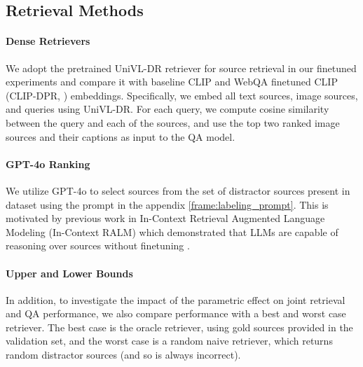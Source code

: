 
\subsection{Retrieval Methods}
\label{sec:retrieval_models}
\paragraph{Dense Retrievers} We adopt the pretrained UniVL-DR retriever for source retrieval in our finetuned experiments \citep{liu_universal_2023} and compare it with baseline CLIP \citep{radford2021learning} and WebQA finetuned CLIP (CLIP-DPR, \cite{liu_universal_2023}) embeddings. Specifically, we embed all text sources, image sources, and queries using UniVL-DR. For each query, we compute cosine similarity between the query and each of the sources, and use the top two ranked image sources and their captions as input to the QA model.

\paragraph{GPT-4o Ranking} 
We utilize GPT-4o to select sources from the set of distractor sources present in dataset using the prompt in the appendix \autoref{frame:labeling_prompt}. This is motivated by previous work in In-Context Retrieval Augmented Language Modeling (In-Context RALM) which demonstrated that LLMs are capable of reasoning over sources without finetuning \citep{incontext_rag}.

\paragraph{Upper and Lower Bounds}
In addition, to investigate the impact of the parametric effect on joint retrieval and QA performance, we also compare performance with a best and worst case retriever. The best case is the oracle retriever, using gold sources provided in the validation set, and the worst case is a random naive retriever, which returns random distractor sources (and so is always incorrect).





